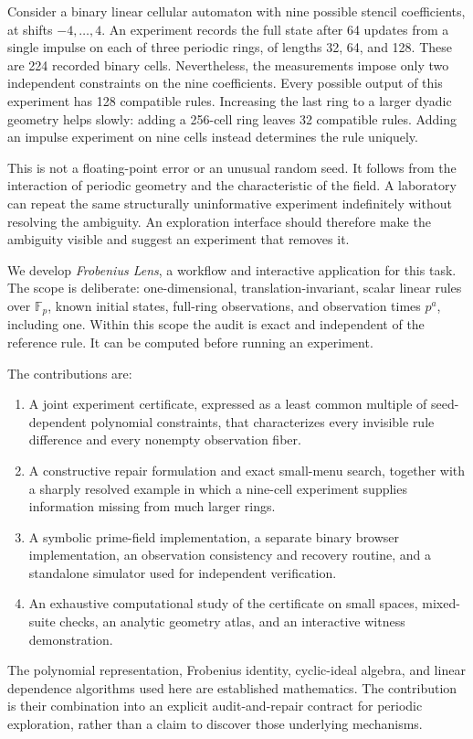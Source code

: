 \documentclass[11pt]{article}
\newcommand{\Fp}{\mathbb F_p}
\begin{document}
Consider a binary linear cellular automaton with nine possible stencil coefficients, at shifts $-4,\ldots,4$. An experiment records the full state after 64 updates from a single impulse on each of three periodic rings, of lengths 32, 64, and 128. These are 224 recorded binary cells. Nevertheless, the measurements impose only two independent constraints on the nine coefficients. Every possible output of this experiment has 128 compatible rules. Increasing the last ring to a larger dyadic geometry helps slowly: adding a 256-cell ring leaves 32 compatible rules. Adding an impulse experiment on nine cells instead determines the rule uniquely.

This is not a floating-point error or an unusual random seed. It follows from the interaction of periodic geometry and the characteristic of the field. A laboratory can repeat the same structurally uninformative experiment indefinitely without resolving the ambiguity. An exploration interface should therefore make the ambiguity visible and suggest an experiment that removes it.

We develop \emph{Frobenius Lens}, a workflow and interactive application for this task. The scope is deliberate: one-dimensional, translation-invariant, scalar linear rules over $\Fp$, known initial states, full-ring observations, and observation times $p^a$, including one. Within this scope the audit is exact and independent of the reference rule. It can be computed before running an experiment.

The contributions are:
\begin{enumerate}
\item A joint experiment certificate, expressed as a least common multiple of seed-dependent polynomial constraints, that characterizes every invisible rule difference and every nonempty observation fiber.
\item A constructive repair formulation and exact small-menu search, together with a sharply resolved example in which a nine-cell experiment supplies information missing from much larger rings.
\item A symbolic prime-field implementation, a separate binary browser implementation, an observation consistency and recovery routine, and a standalone simulator used for independent verification.
\item An exhaustive computational study of the certificate on small spaces, mixed-suite checks, an analytic geometry atlas, and an interactive witness demonstration.
\end{enumerate}
The polynomial representation, Frobenius identity, cyclic-ideal algebra, and linear dependence algorithms used here are established mathematics. The contribution is their combination into an explicit audit-and-repair contract for periodic exploration, rather than a claim to discover those underlying mechanisms.
\end{document}
